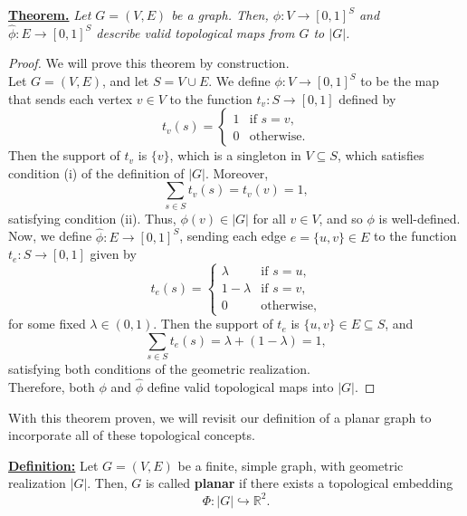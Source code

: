 \documentclass{article}
\begin{document}
\begin{bluebox}
\noindent\underline{\textbf{Theorem.}} \textit{Let $G = (V,E)$ be a graph. Then, $\phi: V \to [0,1]^{S}$ and $\widehat{\phi}:E\to[0,1]^{S}$ describe valid topological maps from $G$ to $|G|$.}
\end{bluebox}
\begin{proof}
    We will prove this theorem by construction.\\

    \noindent Let $G = (V,E)$, and let $S = V \cup E$. We define $\phi: V \to [0,1]^S$ to be the map that sends each vertex $v \in V$ to the function $t_v: S \to [0,1]$ defined by
    \[t_v(s) = 
    \begin{cases}
        1 & \text{if } s = v, \\
        0 & \text{otherwise}.
    \end{cases}\]
    Then the support of $t_v$ is $\{v\}$, which is a singleton in $V \subseteq S$, which satisfies condition (i) of the definition of $|G|$. Moreover,
    \[\sum_{s \in S} t_v(s) = t_v(v) = 1,\]
    satisfying condition (ii). Thus, $\phi(v) \in |G|$ for all $v \in V$, and so $\phi$ is well-defined.\\

    \noindent Now, we define $\widehat{\phi}: E \to [0,1]^S$, sending each edge $e = \{u,v\} \in E$ to the function $t_e: S \to [0,1]$ given by
    $$
    t_e(s) =
    \begin{cases}
        \lambda & \text{if } s = u, \\
        1 - \lambda & \text{if } s = v, \\
        0 & \text{otherwise},
    \end{cases}
    $$
    for some fixed $\lambda \in (0,1)$. Then the support of $t_e$ is $\{u,v\} \in E \subseteq S$, and
    $$
    \sum_{s \in S} t_e(s) = \lambda + (1 - \lambda) = 1,
    $$
    satisfying both conditions of the geometric realization.\\

    \noindent Therefore, both $\phi$ and $\widehat{\phi}$ define valid topological maps into $|G|$.
\end{proof}

\noindent With this theorem proven, we will revisit our definition of a planar graph to incorporate all of these topological concepts.\\

\begin{graybox}
\noindent\underline{\textbf{Definition:}} Let $G = (V,E)$ be a finite, simple graph, with geometric realization $|G|$. Then, $G$ is called \textbf{planar} if there exists a topological embedding
\[\Phi:|G| \hookrightarrow \mathbb{R}^{2}.\]
\end{graybox}
\end{document}

